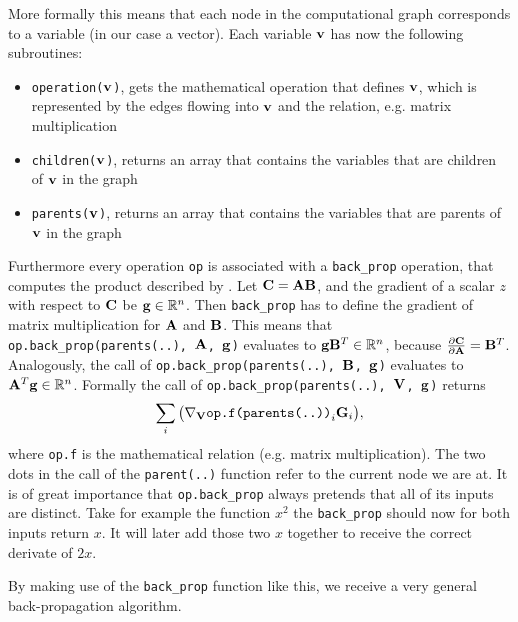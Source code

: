 More formally this means that each node in the computational graph corresponds to a variable (in our case a vector).
Each variable \(\mathbf{v}\) has now the following subroutines:
\begin{itemize}
    \item \texttt{operation(\(\mathbf{v}\))}, gets the mathematical operation that defines \(\mathbf{v}\),
    which is represented by the edges flowing into \(\mathbf{v}\) and the relation, e.g. matrix multiplication
    \item \texttt{children(\(\mathbf{v}\))}, returns an array that contains the variables that are children of \(\mathbf{v}\) in the graph
    \item \texttt{parents(\(\mathbf{v}\))}, returns an array that contains the variables that are parents of \(\mathbf{v}\) in the graph 
\end{itemize}
Furthermore every operation \texttt{op} is associated with a \texttt{back\_prop} operation, that computes the product described by .
Let \(\mathbf{C} = \mathbf{AB}\), and the gradient of a scalar \(z\) with respect to \(\mathbf{C}\) be \(\mathbf{g} \in \mathbb{R}^n\).
Then \texttt{back\_prop} has to define the gradient of matrix multiplication for \(\mathbf{A}\) and \(\mathbf{B}\).
This means that \texttt{op.back\_prop(parents(..), \(\mathbf{A}\), \(\mathbf{g}\))} evaluates to \(\mathbf{g}\mathbf{B}^T \in \mathbb{R}^n\), because \(\frac{\partial \mathbf{C}}{\partial \mathbf{A}} = \mathbf{B}^T\).
Analogously, the call of \texttt{op.back\_prop(parents(..), \(\mathbf{B}\), \(\mathbf{g}\))} evaluates to \(\mathbf{A}^T\mathbf{g} \in \mathbb{R}^n\).
Formally the call of \texttt{op.back\_prop(parents(..), \(\mathbf{V}\), \(\mathbf{g}\))} returns
\begin{equation}
    \sum_{i} \big( \nabla_{\mathbf{V}} \texttt{op.f(parents(..))}_{i} \mathbf{G}_{i} \big),
\end{equation}
where \texttt{op.f} is the mathematical relation (e.g. matrix multiplication).
The two dots in the call of the \texttt{parent(..)} function refer to the current node we are at.
It is of great importance that \texttt{op.back\_prop} always pretends that all of its inputs are distinct.
Take for example the function \(x^2\) the \texttt{back\_prop} should now for both inputs return \(x\).
It will later add those two \(x\) together to receive the correct derivate of \(2x\).

By making use of the \texttt{back\_prop} function like this, we receive a very general back-propagation algorithm.
